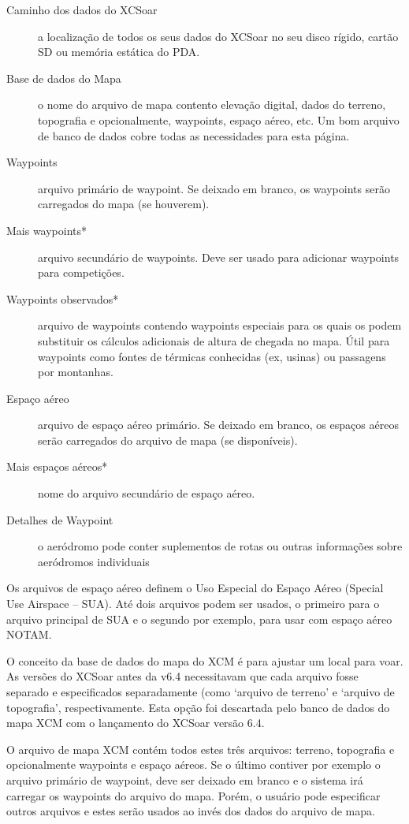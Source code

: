 \begin{description}
\item[Caminho dos dados do XCSoar]  a localização de todos os seus dados do XCSoar no seu disco rígido, cartão SD ou memória estática do PDA.
\item[Base de dados do Mapa]  o nome do arquivo de mapa contento elevação digital, dados do terreno, topografia e opcionalmente, waypoints, espaço aéreo, etc.  Um bom arquivo de banco de dados cobre todas as necessidades para esta página.
\item[Waypoints]  arquivo primário de waypoint.  Se deixado em branco, os waypoints serão carregados do mapa (se houverem).
\item[Mais waypoints*]  arquivo secundário de waypoints.  Deve ser usado para adicionar waypoints para competições.
\item[Waypoints observados*]  arquivo de waypoints contendo waypoints especiais para os quais os podem substituir os cálculos adicionais de altura de chegada no mapa.  Útil para waypoints como fontes de térmicas conhecidas (ex, usinas) ou passagens por montanhas.
\item[Espaço aéreo]  arquivo de espaço aéreo primário.  Se deixado em branco, os espaços aéreos serão carregados do arquivo de mapa (se disponíveis).
\item[Mais espaços aéreos*] nome do arquivo secundário de espaço aéreo.
\item[Detalhes de Waypoint] o aeródromo pode conter suplementos de rotas ou outras informações sobre aeródromos individuais
\end{description}

Os arquivos de espaço aéreo definem o Uso Especial do Espaço Aéreo (Special Use Airspace – SUA).  Até dois arquivos podem ser usados, o primeiro para o arquivo principal de SUA e o segundo por exemplo, para usar com espaço aéreo NOTAM.

O conceito da base de dados do mapa do XCM é para ajustar um local para voar.  As versões do XCSoar antes da v6.4 necessitavam que cada arquivo fosse separado e especificados separadamente (como ‘arquivo de terreno’ e ‘arquivo de topografia’, respectivamente.  Esta opção foi descartada pelo banco de dados do mapa XCM com o lançamento do XCSoar versão 6.4.

O arquivo de mapa XCM contém todos estes três arquivos: terreno, topografia e opcionalmente waypoints e espaço aéreos.  Se o último contiver por exemplo o arquivo primário de waypoint, deve ser deixado em branco e o sistema irá carregar os waypoints do arquivo do mapa.  Porém, o usuário pode especificar outros arquivos e estes serão usados ao invés dos dados do arquivo de mapa.

